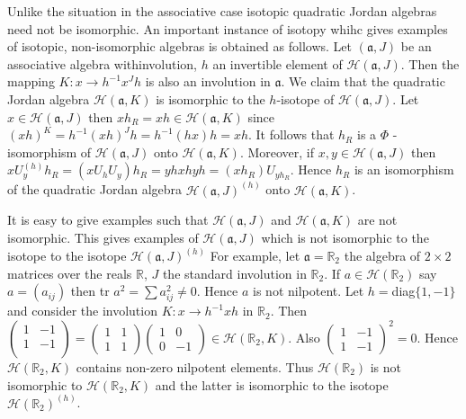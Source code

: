 Unlike the situation in the associative case isotopic quadratic Jordan
algebras need not be isomorphic. An important instance of isotopy
whihc gives examples of isotopic, non-isomorphic algebras is obtained
as follows. Let $(\mathfrak{a},J)$ be an associative algebra
with\pageoriginale involution, $h$ an invertible element of
$\mathscr{H}(\mathfrak{a},J)$. Then the mapping $K:x\to h^{-1}x^{J}h$
is also an involution in $\mathfrak{a}$. We claim that the quadratic
Jordan algebra $\mathscr{H}(\mathfrak{a}, K)$ is isomorphic to the
$h$-isotope of $\mathscr{H}(\mathfrak{a},J)$. Let $x\in
\mathscr{H}(\mathfrak{a},J)$ then $xh_R=xh\in
\mathscr{H}(\mathfrak{a},K)$ since
$(xh)^{K}=h^{-1}(xh)^{J}h=h^{-1}(hx)h=xh$. It follows that $h_R$ is a
$\Phi$ -isomorphism of $\mathscr{H}(\mathfrak{a},J)$ onto
$\mathscr{H}(\mathfrak{a},K)$. Moreover, if $x,y\in
\mathscr{H}(\mathfrak{a},J)$ then $x
U_y^{(h)}h_R=(xU_hU_y)h_R=yh x hyh=(xh_R)U_{yh_R}$. Hence $h_R$ is
an isomorphism of the quadratic Jordan algebra
$\mathscr{H}(\mathfrak{a},J)^{(h)}$ onto
$\mathscr{H}(\mathfrak{a},K)$.

It is easy to give examples such that $\mathscr{H}(\mathfrak{a},J)$
and $\mathscr{H}(\mathfrak{a},K)$ are not isomorphic. This gives
examples of $\mathscr{H}(\mathfrak{a},J)$ which is not isomorphic to
the isotope to the isotope $\mathscr{H}(\mathfrak{a},J)^{(h)}$ For
  example, let $\mathfrak{a}=\mathbb{R}_2$ the algebra of $2\times 2$
  matrices over the reals $\mathbb{R}$, $J$ the standard involution in
  $\mathbb{R}_2$. If $a\in \mathscr{H}(\mathbb{R}_2)$ say
  $a=(a_{ij})$ then tr $a^{2}=\sum a^{2}_{ij}\neq 0$. Hence $a$ is not
  nilpotent. Let $h=$diag$\{1,-1\}$ and consider the involution
  $K:x\to h^{-1}xh$ in $\mathbb{R}_2$. Then $\begin{pmatrix}
    1 & -1\\
    1 &-1\\
  \end{pmatrix}=\begin{pmatrix}
  1 & 1\\
  1 & 1
  \end{pmatrix}\begin{pmatrix}
  1 & 0\\
  0 & -1
  \end{pmatrix}\in \mathscr{H}(\mathbb{R}_2,K)$. Also
  $\begin{pmatrix}
    1 & -1\\
    1 &-1
  \end{pmatrix}^{2}=0$. Hence $\mathscr{H}(\mathbb{R}_2,K)$ contains
  non-zero nilpotent elements. Thus $\mathscr{H}(\mathbb{R}_2)$ is not
  isomorphic to $\mathscr{H}(\mathbb{R}_2,K)$ and the latter is
  isomorphic to the isotope $\mathscr{H}(\mathbb{R}_2)^{(h)}$.


